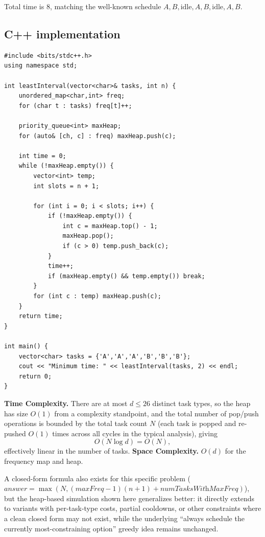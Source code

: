 Total time is $8$, matching the well-known schedule
$A,B,\text{idle},A,B,\text{idle},A,B$.

\subsection*{C++ implementation}

\begin{lstlisting}
#include <bits/stdc++.h>
using namespace std;

int leastInterval(vector<char>& tasks, int n) {
    unordered_map<char,int> freq;
    for (char t : tasks) freq[t]++;

    priority_queue<int> maxHeap;
    for (auto& [ch, c] : freq) maxHeap.push(c);

    int time = 0;
    while (!maxHeap.empty()) {
        vector<int> temp;
        int slots = n + 1;

        for (int i = 0; i < slots; i++) {
            if (!maxHeap.empty()) {
                int c = maxHeap.top() - 1;
                maxHeap.pop();
                if (c > 0) temp.push_back(c);
            }
            time++;
            if (maxHeap.empty() && temp.empty()) break;
        }
        for (int c : temp) maxHeap.push(c);
    }
    return time;
}

int main() {
    vector<char> tasks = {'A','A','A','B','B','B'};
    cout << "Minimum time: " << leastInterval(tasks, 2) << endl;
    return 0;
}
\end{lstlisting}

\begin{complexitybox}
\textbf{Time Complexity.} There are at most $d \le 26$ distinct task
types, so the heap has size $O(1)$ from a complexity standpoint, and the
total number of pop/push operations is bounded by the total task count
$N$ (each task is popped and re-pushed $O(1)$ times across all cycles in
the typical analysis), giving
\[
  O(N \log d) = O(N),
\]
effectively linear in the number of tasks.
\textbf{Space Complexity.} $O(d)$ for the frequency map and heap.
\end{complexitybox}

\begin{takeawaybox}
A closed-form formula also exists for this specific problem
($\textit{answer} = \max(N, (\textit{maxFreq}-1)(n+1) + \textit{numTasksWithMaxFreq})$),
but the heap-based simulation shown here generalizes better: it directly
extends to variants with per-task-type costs, partial cooldowns, or other
constraints where a clean closed form may not exist, while the
underlying ``always schedule the currently most-constraining option'' greedy
idea remains unchanged.
\end{takeawaybox}
